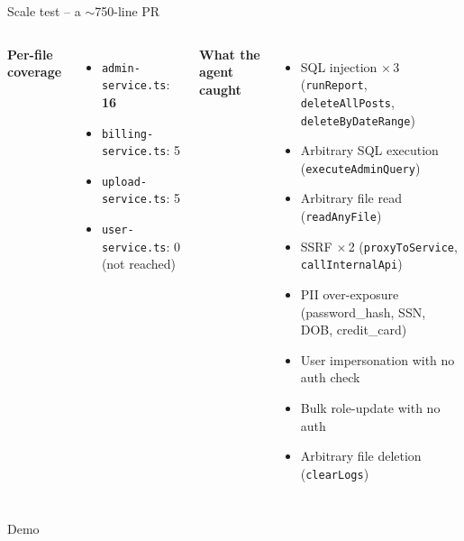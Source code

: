 \documentclass[10pt,aspectratio=169]{beamer}
\begin{document}
\begin{frame}{Scale test -- a $\sim$750-line PR}
\begin{columns}[T,onlytextwidth]
      \footnotesize\textbf{Per-file coverage}
      \begin{itemize}\scriptsize
        \item \texttt{admin-service.ts}: \textbf{16}
        \item \texttt{billing-service.ts}: 5
        \item \texttt{upload-service.ts}: 5
        \item \texttt{user-service.ts}: 0 (\alert{not reached})
      \end{itemize}
      \footnotesize\textbf{What the agent caught}
      \begin{itemize}\scriptsize
        \item SQL injection $\times$\,3 (\texttt{runReport}, \texttt{deleteAllPosts}, \texttt{deleteByDateRange})
        \item Arbitrary SQL execution (\texttt{executeAdminQuery})
        \item Arbitrary file read (\texttt{readAnyFile})
        \item SSRF $\times$\,2 (\texttt{proxyToService}, \texttt{callInternalApi})
        \item PII over-exposure (password\_hash, SSN, DOB, credit\_card)
        \item User impersonation with no auth check
        \item Bulk role-update with no auth
        \item Arbitrary file deletion (\texttt{clearLogs})
      \end{itemize}
  \end{columns}
\end{frame}

\begin{frame}[standout]
  Demo
  \vspace{6pt}\\
\end{frame}
\end{document}
